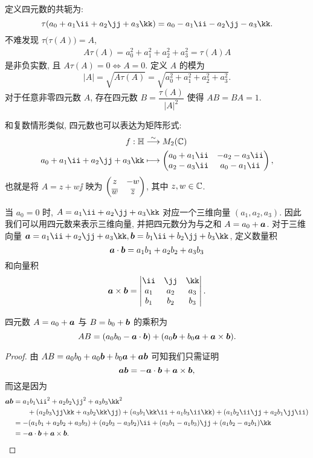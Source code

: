 定义四元数的共轭为:
\[
  \tau(a_0+a_1\ii+a_2\jj+a_3\kk)
  =a_0-a_1\ii-a_2\jj-a_3\kk.
\]
不难发现 $\tau\bigl(\tau(A)\bigr)=A$,
\begin{align*}
   A\tau(A)
  =a_0^2+a_1^2+a_2^2+a_3^2
  =\tau(A)A
\end{align*}
是非负实数, 且 $A\tau(A)=0\iff A=0$. 
定义 $A$ 的模为
\[
  |A|=\sqrt{A\tau(A)}=\sqrt{a_0^2+a_1^2+a_2^2+a_3^2}.
\]
对于任意非零四元数 $A$, 存在四元数 $B=\dfrac{\tau(A)}{|A|^2}$ 使得 $AB=BA=1$. 

和复数情形类似, 四元数也可以表达为矩阵形式:
\begin{equation}
  \label{eq:quaternion-matrix}
  \begin{aligned}
    f:\BH&\simto M_2(\BC)\\
    a_0+a_1\ii+a_2\jj+a_3\kk&\lto \begin{pmatrix}
      a_0+a_1\ii&-a_2-a_3\ii\\
      a_2-a_3\ii&a_0-a_1\ii
    \end{pmatrix},
  \end{aligned}
\end{equation}
也就是将 $A=z+w\jj$ 映为 $\begin{pmatrix}
  z&-w\\\overline w&\overline z
\end{pmatrix}$, 其中 $z,w\in{\mathbb{C}}$.

当 $a_0=0$ 时, $A=a_1\ii+a_2\jj+a_3\kk$ 对应一个三维向量 $(a_1,a_2,a_3)$.
因此我们可以用四元数来表示三维向量, 并把四元数分为与之和 $A=a_0+{\boldsymbol{a}}$.
对于三维向量 $\bfa=a_1\ii+a_2\jj+a_3\kk, \bfb=b_1\ii+b_2\jj+b_3\kk$, 定义数量积
\[
  {\boldsymbol{a}}\cdot{\boldsymbol{b}}=a_1b_1+a_2b_2+a_3b_3
\]
和向量积
\[
  \bfa\times\bfb=\begin{vmatrix}
    \ii&\jj&\kk\\
    a_1&a_2&a_3\\
    b_1&b_2&b_3
  \end{vmatrix}.
\]

\begin{theorem}
  四元数 $A=a_0+{\boldsymbol{a}}$ 与 $B=b_0+{\boldsymbol{b}}$ 的乘积为
  \[
    AB=(a_0b_0-{\boldsymbol{a}}\cdot{\boldsymbol{b}})+(a_0{\boldsymbol{b}}+b_0{\boldsymbol{a}}+{\boldsymbol{a}}\times{\boldsymbol{b}}).
  \]
\end{theorem}

\begin{proof}
  由 $AB=a_0b_0+a_0{\boldsymbol{b}}+b_0{\boldsymbol{a}}+{\boldsymbol{a}}{\boldsymbol{b}}$ 可知我们只需证明
  \[
    {\boldsymbol{a}}{\boldsymbol{b}}=-{\boldsymbol{a}}\cdot{\boldsymbol{b}}+{\boldsymbol{a}}\times{\boldsymbol{b}},
  \]
  而这是因为
  \begin{align*}
     \bfa\bfb&
    =a_1b_1\ii^2+a_2b_2\jj^2+a_3b_3\kk^2\\&
      \qquad
      +(a_2b_3\jj\kk+a_3b_2\kk\jj)
      +(a_3b_1\kk\ii+a_1b_3\ii\kk)
      +(a_1b_2\ii\jj+a_2b_1\jj\ii)\\&
    =-(a_1b_1+a_2b_2+a_3b_3)
      +(a_2b_3-a_3b_2)\ii
      +(a_3b_1-a_1b_3)\jj
      +(a_1b_2-a_2b_1)\kk\\&
    =-\bfa\cdot\bfb+\bfa\times\bfb.\qedhere
  \end{align*}
\end{proof}

